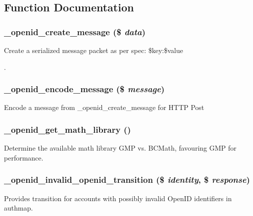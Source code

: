 \subsection{Function Documentation}
\hypertarget{openid_8inc_a5d5952e825b3e17cc2765760baf69d4f}{
\subsubsection[{\_\-openid\_\-create\_\-message}]{\setlength{\rightskip}{0pt plus 5cm}\_\-openid\_\-create\_\-message (\$ {\em data})}}
\label{openid_8inc_a5d5952e825b3e17cc2765760baf69d4f}
Create a serialized message packet as per spec: \$key:\$value\par
 . \hypertarget{openid_8inc_a367a73e53a7544157b49ffbedcbdb444}{
\subsubsection[{\_\-openid\_\-encode\_\-message}]{\setlength{\rightskip}{0pt plus 5cm}\_\-openid\_\-encode\_\-message (\$ {\em message})}}
\label{openid_8inc_a367a73e53a7544157b49ffbedcbdb444}
Encode a message from \_\-openid\_\-create\_\-message for HTTP Post \hypertarget{openid_8inc_a00d68cf0fdb81c4031ecf0fa7f0c2845}{
\subsubsection[{\_\-openid\_\-get\_\-math\_\-library}]{\setlength{\rightskip}{0pt plus 5cm}\_\-openid\_\-get\_\-math\_\-library ()}}
\label{openid_8inc_a00d68cf0fdb81c4031ecf0fa7f0c2845}
Determine the available math library GMP vs. BCMath, favouring GMP for performance. \hypertarget{openid_8inc_a239b587eb43a464005a538f698873a61}{
\subsubsection[{\_\-openid\_\-invalid\_\-openid\_\-transition}]{\setlength{\rightskip}{0pt plus 5cm}\_\-openid\_\-invalid\_\-openid\_\-transition (\$ {\em identity}, \/  \$ {\em response})}}
\label{openid_8inc_a239b587eb43a464005a538f698873a61}
Provides transition for accounts with possibly invalid OpenID identifiers in authmap.

